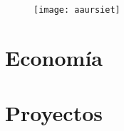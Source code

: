 \documentclass[12pt,oneside,a4paper]{article}
\begin{document}


\vspace{3cm}

{\tableofcontents}
\begin{figure}
    \texttt{[image: aaursiet]}
    \caption{}\label{}
\end{figure}
\newpage

\part{Economía}\label{prt:economia}



\newpage



\newpage



\newpage

\part{Proyectos}\label{prt:proyectos}








\end{document}
